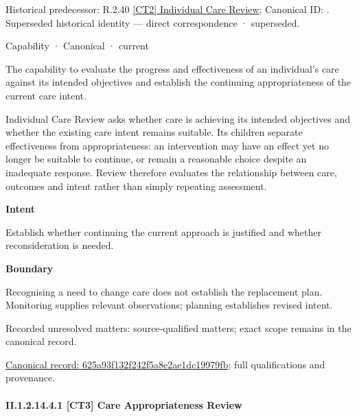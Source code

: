 {\small Historical predecessor: R.2.40 \hyperref[element:e1048f6c635d4e16b5384cc2cb45a71b]{[CT2] Individual Care Review}; Canonical ID: \texttt{}. Superseded historical identity — direct correspondence · superseded.}\par
\label{element:625a93f132f242f5a8e2ae1dc19979fb}
{\small Capability · Canonical · current}\par

The capability to evaluate the progress and effectiveness of an individual's care against its intended objectives and establish the continuing appropriateness of the current care intent.



Individual Care Review asks whether care is achieving its intended objectives and whether the existing care intent remains suitable. Its children separate effectiveness from appropriateness: an intervention may have an effect yet no longer be suitable to continue, or remain a reasonable choice despite an inadequate response. Review therefore evaluates the relationship between care, outcomes and intent rather than simply repeating assessment.



\textbf{Intent}



Establish whether continuing the current approach is justified and whether reconsideration is needed.



\textbf{Boundary}



Recognising a need to change care does not establish the replacement plan. Monitoring supplies relevant observations; planning establishes revised intent.


{\small Recorded unresolved matters: source-qualified matters; exact scope remains in the canonical record.}\par
{\footnotesize \href{../../../../continuum/strategy/capability/625a93f132f242f5a8e2ae1dc19979fb.md}{Canonical record: 625a93f132f242f5a8e2ae1dc19979fb}; full qualifications and provenance.}\par
\paragraph*{II.1.2.14.4.1 [CT3] Care Appropriateness Review}
\label{navigation:II.1.2.14.4.1}

